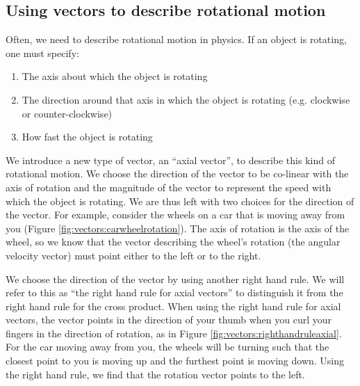 \subsection{\label{subsec:Vectors:rotationalmotion}Using vectors to describe rotational motion}
Often, we need to describe rotational motion in physics. If an object is rotating, one must specify:
\begin{enumerate}
\item The axis about which the object is rotating
\item The direction around that axis in which the object is rotating (e.g. clockwise or counter-clockwise)
\item How fast the object is rotating
\end{enumerate}
We introduce a new type of vector, an ``axial vector'', to describe this kind of rotational motion. We choose the direction of the vector to be co-linear with the axis of rotation and the magnitude of the vector to represent the speed with which the object is rotating. We are thus left with two choices for the direction of the vector. For example, consider the wheels on a car that is moving away from you (Figure \ref{fig:vectors:carwheelrotation}).  The axis of rotation is the axis of the wheel, so we know that the vector describing the wheel's rotation (the angular velocity vector) must point either to the left or to the right. 


We choose the direction of the vector by using another right hand rule. We will refer to this as ``the right hand rule for axial vectors'' to distinguish it from the right hand rule for the cross product.  When using the right hand rule for axial vectors, the vector points in the direction of your thumb when you curl your fingers in the direction of rotation, as in Figure \ref{fig:vectors:righthandruleaxial}. For the car moving away from you, the wheels will be turning such that the closest point to you is moving up and the furthest point is moving down. Using the right hand rule, we find that the rotation vector points to the left. 


